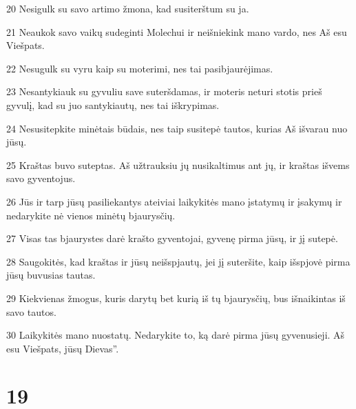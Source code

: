 \par 20 Nesigulk su savo artimo žmona, kad susiterštum su ja. 
\par 21 Neaukok savo vaikų sudeginti Molechui ir neišniekink mano vardo, nes Aš esu Viešpats. 
\par 22 Nesugulk su vyru kaip su moterimi, nes tai pasibjaurėjimas. 
\par 23 Nesantykiauk su gyvuliu save suteršdamas, ir moteris neturi stotis prieš gyvulį, kad su juo santykiautų, nes tai iškrypimas. 
\par 24 Nesusitepkite minėtais būdais, nes taip susitepė tautos, kurias Aš išvarau nuo jūsų. 
\par 25 Kraštas buvo suteptas. Aš užtrauksiu jų nusikaltimus ant jų, ir kraštas išvems savo gyventojus. 
\par 26 Jūs ir tarp jūsų pasiliekantys ateiviai laikykitės mano įstatymų ir įsakymų ir nedarykite nė vienos minėtų bjaurysčių. 
\par 27 Visas tas bjaurystes darė krašto gyventojai, gyvenę pirma jūsų, ir jį sutepė. 
\par 28 Saugokitės, kad kraštas ir jūsų neišspjautų, jei jį suteršite, kaip išspjovė pirma jūsų buvusias tautas. 
\par 29 Kiekvienas žmogus, kuris darytų bet kurią iš tų bjaurysčių, bus išnaikintas iš savo tautos. 
\par 30 Laikykitės mano nuostatų. Nedarykite to, ką darė pirma jūsų gyvenusieji. Aš esu Viešpats, jūsų Dievas”.



\chapter{19}


